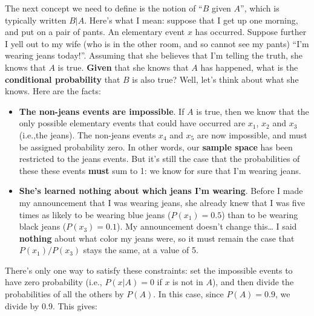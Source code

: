 \documentclass[
  letterpaper,
  DIV=11,
  numbers=noendperiod]{scrreprt}
\begin{document}
The next concept we need to define is the notion of ``\(B\) given
\(A\)'', which is typically written \(B | A\). Here's what I mean:
suppose that I get up one morning, and put on a pair of pants. An
elementary event \(x\) has occurred. Suppose further I yell out to my
wife (who is in the other room, and so cannot see my pants) ``I'm
wearing jeans today!''. Assuming that she believes that I'm telling the
truth, she knows that \(A\) is true. \textbf{Given} that she knows that
\(A\) has happened, what is the \textbf{conditional probability} that
\(B\) is also true? Well, let's think about what she knows. Here are the
facts:

\begin{itemize}
\item
  \textbf{The non-jeans events are impossible}. If \(A\) is true, then
  we know that the only possible elementary events that could have
  occurred are \(x_1\), \(x_2\) and \(x_3\) (i.e.,the jeans). The
  non-jeans events \(x_4\) and \(x_5\) are now impossible, and must be
  assigned probability zero. In other words, our \textbf{sample space}
  has been restricted to the jeans events. But it's still the case that
  the probabilities of these these events \textbf{must} sum to 1: we
  know for sure that I'm wearing jeans.
\item
  \textbf{She's learned nothing about which jeans I'm wearing}. Before I
  made my announcement that I was wearing jeans, she already knew that I
  was five times as likely to be wearing blue jeans (\(P(x_1) = 0.5\))
  than to be wearing black jeans (\(P(x_3) = 0.1\)). My announcement
  doesn't change this\ldots{} I said \textbf{nothing} about what color
  my jeans were, so it must remain the case that \(P(x_1) / P(x_3)\)
  stays the same, at a value of 5.
\end{itemize}

There's only one way to satisfy these constraints: set the impossible
events to have zero probability (i.e., \(P(x | A) = 0\) if \(x\) is not
in \(A\)), and then divide the probabilities of all the others by
\(P(A)\). In this case, since \(P(A) = 0.9\), we divide by 0.9. This
gives:
\end{document}
